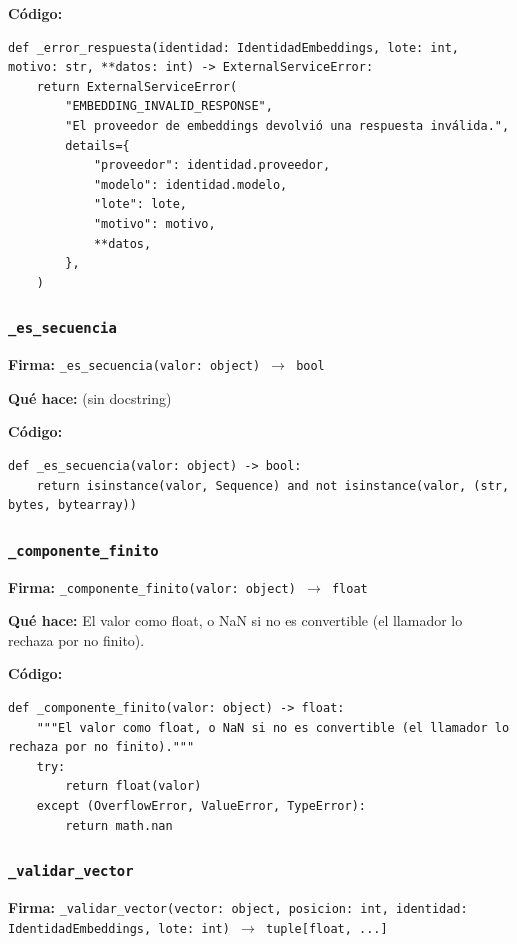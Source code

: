 \documentclass[11pt,a4paper]{article}
\begin{document}
\textbf{Código:}
\begin{lstlisting}
def _error_respuesta(identidad: IdentidadEmbeddings, lote: int, motivo: str, **datos: int) -> ExternalServiceError:
    return ExternalServiceError(
        "EMBEDDING_INVALID_RESPONSE",
        "El proveedor de embeddings devolvió una respuesta inválida.",
        details={
            "proveedor": identidad.proveedor,
            "modelo": identidad.modelo,
            "lote": lote,
            "motivo": motivo,
            **datos,
        },
    )
\end{lstlisting}

\subsubsection*{\texttt{\_es\_secuencia}}
\textbf{Firma:} \texttt{\_es\_secuencia(valor: object) $\rightarrow$ bool}

\textbf{Qué hace:} (sin docstring)

\textbf{Código:}
\begin{lstlisting}
def _es_secuencia(valor: object) -> bool:
    return isinstance(valor, Sequence) and not isinstance(valor, (str, bytes, bytearray))
\end{lstlisting}

\subsubsection*{\texttt{\_componente\_finito}}
\textbf{Firma:} \texttt{\_componente\_finito(valor: object) $\rightarrow$ float}

\textbf{Qué hace:} El valor como float, o NaN si no es convertible (el llamador lo rechaza por no finito).

\textbf{Código:}
\begin{lstlisting}
def _componente_finito(valor: object) -> float:
    """El valor como float, o NaN si no es convertible (el llamador lo rechaza por no finito)."""
    try:
        return float(valor)
    except (OverflowError, ValueError, TypeError):
        return math.nan
\end{lstlisting}

\subsubsection*{\texttt{\_validar\_vector}}
\textbf{Firma:} \texttt{\_validar\_vector(vector: object, posicion: int, identidad: IdentidadEmbeddings, lote: int) $\rightarrow$ tuple[float, ...]}
\end{document}
